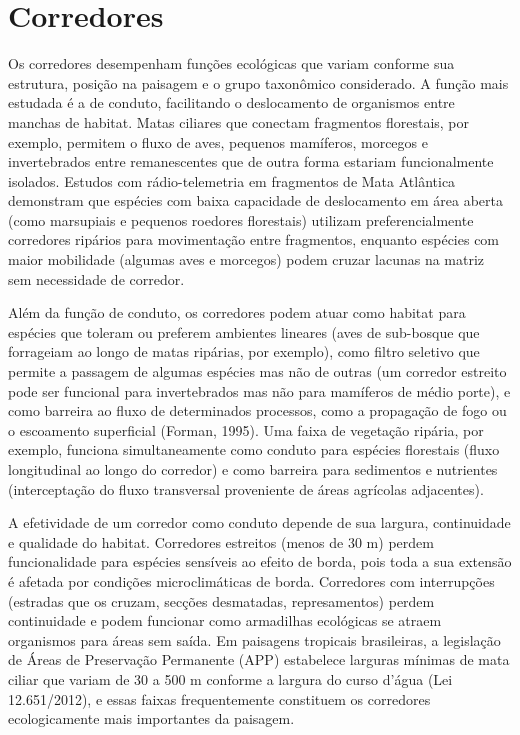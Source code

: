 \documentclass[
  portuguese,
  11pt,
  a4paper,
  open=any]{scrbook}
\begin{document}
\section{Corredores}\label{corredores}

Os corredores desempenham funções ecológicas que variam conforme sua
estrutura, posição na paisagem e o grupo taxonômico considerado. A
função mais estudada é a de conduto, facilitando o deslocamento de
organismos entre manchas de habitat. Matas ciliares que conectam
fragmentos florestais, por exemplo, permitem o fluxo de aves, pequenos
mamíferos, morcegos e invertebrados entre remanescentes que de outra
forma estariam funcionalmente isolados. Estudos com rádio-telemetria em
fragmentos de Mata Atlântica demonstram que espécies com baixa
capacidade de deslocamento em área aberta (como marsupiais e pequenos
roedores florestais) utilizam preferencialmente corredores ripários para
movimentação entre fragmentos, enquanto espécies com maior mobilidade
(algumas aves e morcegos) podem cruzar lacunas na matriz sem necessidade
de corredor.

Além da função de conduto, os corredores podem atuar como habitat para
espécies que toleram ou preferem ambientes lineares (aves de sub-bosque
que forrageiam ao longo de matas ripárias, por exemplo), como filtro
seletivo que permite a passagem de algumas espécies mas não de outras
(um corredor estreito pode ser funcional para invertebrados mas não para
mamíferos de médio porte), e como barreira ao fluxo de determinados
processos, como a propagação de fogo ou o escoamento superficial
(Forman, 1995). Uma faixa de vegetação ripária, por exemplo, funciona
simultaneamente como conduto para espécies florestais (fluxo
longitudinal ao longo do corredor) e como barreira para sedimentos e
nutrientes (interceptação do fluxo transversal proveniente de áreas
agrícolas adjacentes).

A efetividade de um corredor como conduto depende de sua largura,
continuidade e qualidade do habitat. Corredores estreitos (menos de 30
m) perdem funcionalidade para espécies sensíveis ao efeito de borda,
pois toda a sua extensão é afetada por condições microclimáticas de
borda. Corredores com interrupções (estradas que os cruzam, secções
desmatadas, represamentos) perdem continuidade e podem funcionar como
armadilhas ecológicas se atraem organismos para áreas sem saída. Em
paisagens tropicais brasileiras, a legislação de Áreas de Preservação
Permanente (APP) estabelece larguras mínimas de mata ciliar que variam
de 30 a 500 m conforme a largura do curso d'água (Lei 12.651/2012), e
essas faixas frequentemente constituem os corredores ecologicamente mais
importantes da paisagem.
\end{document}
